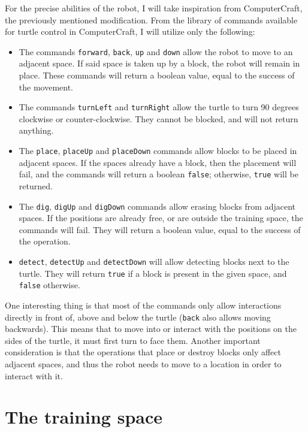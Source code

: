 \documentclass{report}
\begin{document}
For the precise abilities of the robot, I will take inspiration from ComputerCraft, the previously mentioned modification. From the library of commands available for turtle control in ComputerCraft, I will utilize only the following:

\begin{itemize}
    \item The commands \texttt{forward}, \texttt{back}, \texttt{up} and \texttt{down} allow the robot to move to an adjacent space. If said space is taken up by a block, the robot will remain in place. These commands will return a boolean value, equal to the success of the movement.
    \item The commands \texttt{turnLeft} and \texttt{turnRight} allow the turtle to turn 90 degrees clockwise or counter-clockwise. They cannot be blocked, and will not return anything.
    \item The \texttt{place}, \texttt{placeUp} and \texttt{placeDown} commands allow blocks to be placed in adjacent spaces. If the spaces already have a block, then the placement will fail, and the commands will return a boolean \texttt{false}; otherwise, \texttt{true} will be returned.
    \item The \texttt{dig}, \texttt{digUp} and \texttt{digDown} commands allow erasing blocks from adjacent spaces. If the positions are already free, or are outside the training space, the commands will fail. They will return a boolean value, equal to the success of the operation.
    \item \texttt{detect}, \texttt{detectUp} and \texttt{detectDown} will allow detecting blocks next to the turtle. They will return \texttt{true} if a block is present in the given space, and \texttt{false} otherwise.
\end{itemize}

One interesting thing is that most of the commands only allow interactions directly in front of, above and below the turtle (\texttt{back} also allows moving backwards). This means that to move into or interact with the positions on the sides of the turtle, it must first turn to face them. Another important consideration is that the operations that place or destroy blocks only affect adjacent spaces, and thus the robot needs to move to a location in order to interact with it.

\section{The training space}
\end{document}

